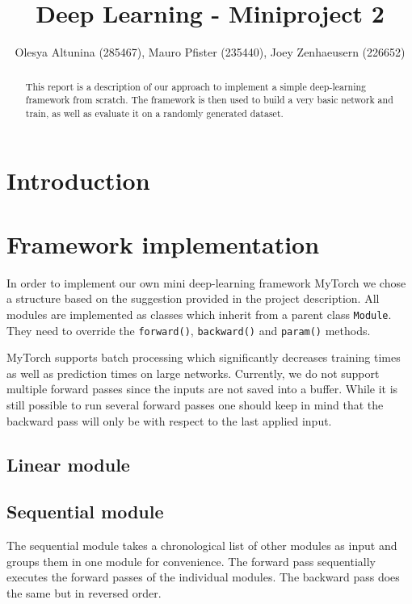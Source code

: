 \documentclass[10pt,conference,compsocconf]{IEEEtran}
\begin{document}
\title{Deep Learning - Miniproject 2}

\author{
  Olesya Altunina (285467), Mauro Pfister (235440), Joey Zenhaeusern (226652)
}

\maketitle

\begin{abstract}
This report is a description of our approach to implement a simple deep-learning framework from scratch. The framework is then used to build a very basic network and train, as well as evaluate it on a randomly generated dataset.
\end{abstract}

\section{Introduction}

\section{Framework implementation}
In order to implement our own mini deep-learning framework MyTorch we chose a structure based on the suggestion provided in the project description. All modules are implemented as classes which inherit from a parent class \texttt{Module}. They need to override the \texttt{forward()}, \texttt{backward()} and \texttt{param()} methods.

MyTorch supports batch processing which significantly decreases training times as well as prediction times on large networks. Currently, we do not support multiple forward passes since the inputs are not saved into a buffer. While it is still possible to run several forward passes one should keep in mind that the backward pass will only be with respect to the last applied input.

\subsection{Linear module}

\subsection{Sequential module}
The sequential module takes a chronological list of other modules as input and groups them in one module for convenience. The forward pass sequentially executes the forward passes of the individual modules. The backward pass does the same but in reversed order.
\end{document}
